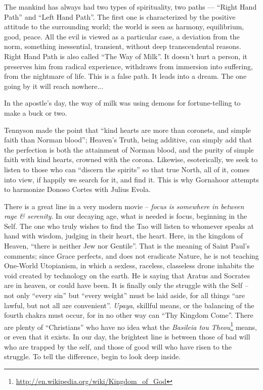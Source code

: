 \begin{quotex}
The mankind has always had two types of spirituality, two paths --- ``Right Hand Path'' and ``Left Hand Path''. The first one is characterized by the positive attitude to the surrounding world; the world is seen as harmony, equilibrium, good, peace. All the evil is viewed as a particular case, a deviation from the norm, something inessential, transient, without deep transcendental reasons. Right Hand Path is also called ``The Way of Milk''. It doesn't hurt a person, it preserves him from radical experience, withdraws from immersion into suffering, from the nightmare of life. This is a false path. It leads into a dream. The one going by it will reach nowhere... 
\end{quotex}


In the apostle's day, the way of milk was using demons for fortune-telling to make a buck or two.

Tennyson made the point that ``kind hearts are more than coronets, and simple faith than Norman blood''; Heaven's Truth, being additive, can simply add that the perfection is both the attainment of Norman blood, and the purity of simple faith with kind hearts, crowned with the corona. Likewise, esoterically, we seek to listen to those who can ``discern the spirits'' so that true North, all of it, comes into view, if happily we search for it, and find it. This is why Gornahoor attempts to harmonize Donoso Cortes with Julius Evola.

There is a great line in a very modern movie -- \emph{focus is somewhere in between rage \& serenity}. In our decaying age, what is needed is focus, beginning in the Self. The one who truly wishes to find the Tao will listen to whomever speaks at hand with wisdom, judging in their heart, the heart. Here, in the kingdom of Heaven, ``there is neither Jew nor Gentile''. That is the meaning of Saint Paul's comments; since Grace perfects, and does not eradicate Nature, he is not teaching One-World Utopianism, in which a sexless, raceless, classeless drone inhabits the void created by technology on the earth. He is saying that Aratus and Socrates are in heaven, or could have been. It is finally only the struggle with the Self -- not only ``every sin'' but ``every weight'' must be laid aside, for all things ``are lawful, but not all are convenient''. \emph{Upaya}, skillful means, or the balancing of the fourth chakra must occur, for in no other way can ``Thy Kingdom Come''. There are plenty of ``Christians'' who have no idea what the \emph{Basileia tou Theou}\footnote{\url{http://en.wikipedia.org/wiki/Kingdom\_of\_God}} means, or even that it exists. In our day, the brightest line is between those of bad will who are trapped by the self, and those of good will who have risen to the struggle. To tell the difference, begin to look deep inside.


